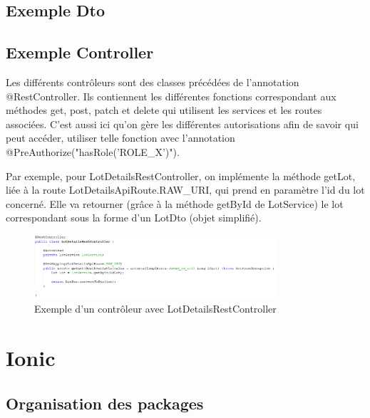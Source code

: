		\subsection{Exemple Dto}



		\subsection{Exemple Controller}

			Les différents contrôleurs sont des classes précédées de l'annotation @RestController. \newline
			Ils contiennent les différentes fonctions correspondant aux méthodes get, post, patch et delete qui utilisent les services et les routes associées. C'est aussi ici qu'on gère les différentes autorisations afin de savoir qui peut accéder, utiliser telle fonction avec l'annotation @PreAuthorize("hasRole('ROLE\_X')").

			\noindent
			Par exemple, pour LotDetailsRestController, on implémente la méthode getLot, liée à la route LotDetailsApiRoute.RAW\_URI, qui prend en paramètre l'id du lot concerné. Elle va retourner (grâce à la méthode getById de LotService) le lot correspondant sous la forme d'un LotDto (objet simplifié).

			\begin{figure}[H]
				\centering\includegraphics[width=0.80\textwidth, keepaspectratio]{res/lotsController.png}
				\caption{Exemple d'un contrôleur avec LotDetailsRestController}
			\end{figure}


	\section{Ionic}

		\subsection{Organisation des packages}

